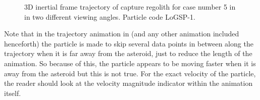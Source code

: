 \FloatBarrier
\begin{figure}[htb]
\centering
\captionsetup{justification=centering}
\caption{3D inertial frame trajectory of capture regolith for case number 5 in  in two different viewing angles. Particle code LoGSP-1.}
\label{fig:LoGSP_1_capture_case_5_3d_traj_inertialFrame_differnetViews}
\end{figure}
\FloatBarrier
Note that in the trajectory animation in  (and any other animation included henceforth) the particle is made to skip several data points in between along the trajectory when it is far away from the asteroid, just to reduce the length of the animation. So because of this, the particle appears to be moving faster when it is away from the asteroid but this is not true. For the exact velocity of the particle, the reader should look at the velocity magnitude indicator within the animation itself.
